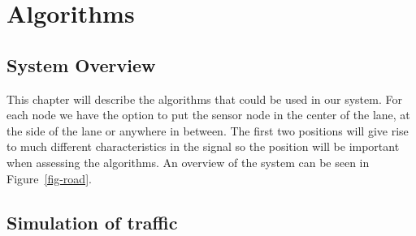 \cleardoublepage\chapter{Algorithms}\label{chap:algorithms}
\section{System Overview}
This chapter will describe the algorithms that could be used in our system. For each node we have the option to put the sensor node in the center of the lane, at the side of the lane or anywhere in between. The first two positions will give rise to much different characteristics in the signal so the position will be important when assessing the algorithms. An overview of the system can be seen in Figure~\ref{fig-road}.

\section{Simulation of traffic}

